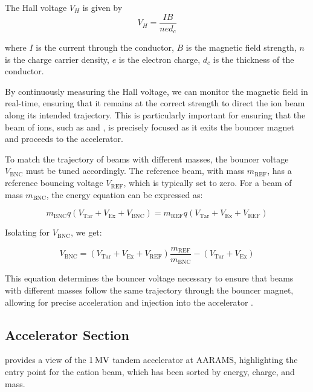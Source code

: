 The Hall voltage $V_{H}$ is given by
\begin{equation}
    V_H = \frac{I B}{n e d_{c}}
    \label{hallvoltage}
\end{equation}

where $I$ is the current through the conductor, $B$ is the magnetic field strength, $n$ is the charge carrier density, $e$ is the electron charge, $d_{c}$ is the thickness of the conductor.

By continuously measuring the Hall voltage, we can monitor the magnetic field in real-time, ensuring that it remains at the correct strength to direct the ion beam along its intended trajectory. This is particularly important for ensuring that the beam of ions, such as  and , is precisely focused as it exits the bouncer magnet and proceeds to the accelerator.

To match the trajectory of beams with different masses, the bouncer voltage \( V_{\text{BNC}} \) must be tuned accordingly. The reference beam, with mass \( m_{\text{REF}} \), has a reference bouncing voltage \( V_{\text{REF}} \), which is typically set to zero. For a beam of mass \( m_{\text{BNC}} \), the energy equation can be expressed as:

\begin{equation}
    m_{\text{BNC}}  q  (V_{\text{Tar}} + V_{\text{Ex}} + V_{\text{BNC}}) = m_{\text{REF}}  q  (V_{\text{Tar}} + V_{\text{Ex}} + V_{\text{REF}})
\end{equation}

Isolating for \( V_{\text{BNC}} \), we get:

\begin{equation}
    V_{\text{BNC}} = (V_{\text{Tar}} + V_{\text{Ex}} + V_{\text{REF}})  \frac{m_{\text{REF}}}{m_{\text{BNC}}} - (V_{\text{Tar}} + V_{\text{Ex}})
\end{equation}

This equation determines the bouncer voltage necessary to ensure that beams with different masses follow the same trajectory through the bouncer magnet, allowing for precise acceleration and injection into the accelerator \cite{HVEE2013}.


\subsection{ Accelerator Section}
  provides a view of the 1$\, \mathrm{MV}$ tandem accelerator at AARAMS, highlighting the entry point for the cation beam, which has been sorted by energy, charge, and mass.

